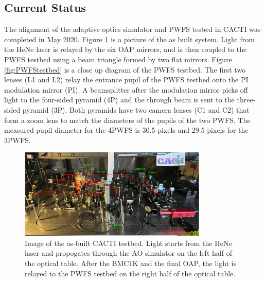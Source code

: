 \documentclass[12pt]{spieman}  %
\begin{document}
\begin{spacing}{2}
\subsection{Current Status}

The alignment of the adaptive optics simulator and PWFS tesbed in CACTI was completed in May 2020. Figure \ref{fig:cactiTestbed} is a picture of the as built system. Light from the HeNe laser is relayed by the six OAP mirrors, and is then coupled to the PWFS testbed using a beam triangle formed by two flat mirrors. Figure \ref{fig:PWFStestbed} is a close up diagram of the PWFS testbed. The first two lenses (L1 and L2) relay the entrance pupil of the PWFS testbed onto the PI modulation mirror (PI). A beamsplitter after the modulation mirror picks off light to the four-sided pyramid (4P) and the through beam is sent to the three-sided pyramid (3P). Both pyramids have two camera lenses (C1 and C2) that form a zoom lens to match the diameters of the pupils of the two PWFS. The measured pupil diameter for the 4PWFS is 30.5 pixels and 29.5 pixels for the 3PWFS. 

\begin{figure}
    \centering
    \includegraphics[width=0.8\textwidth]{cactiTestbed.png}
    \caption{Image of the as-built CACTI testbed. Light starts from the HeNe laser and propogates through the AO simulator on the left half of the optical table. After the BMC1K and the final OAP, the light is relayed to the PWFS testbed on the right half of the optical table.}
    \label{fig:cactiTestbed}
\end{figure}


\end{spacing}
\end{document}
